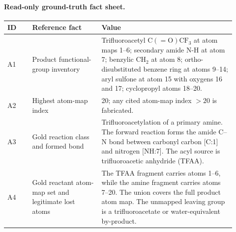 \begin{appendices}
\paragraph{Read-only ground-truth fact sheet.}
\begin{longtable}{P{0.10\linewidth}P{0.28\linewidth}P{0.54\linewidth}}
\toprule
\textbf{ID} & \textbf{Reference fact} & \textbf{Value} \\
\midrule
A1 & Product functional-group inventory & Trifluoroacetyl \(\mathrm{C(=O)CF_3}\) at atom maps 1--6; secondary amide N-H at atom 7; benzylic \(\mathrm{CH_2}\) at atom 8; ortho-disubstituted benzene ring at atoms 9--14; aryl sulfone at atom 15 with oxygens 16 and 17; cyclopropyl atoms 18--20. \\
A2 & Highest atom-map index & 20; any cited atom-map index \(>20\) is fabricated. \\
A3 & Gold reaction class and formed bond & Trifluoroacetylation of a primary amine. The forward reaction forms the amide C--N bond between carbonyl carbon [C:1] and nitrogen [NH:7]. The acyl source is trifluoroacetic anhydride (TFAA). \\
A4 & Gold reactant atom-map set and legitimate lost atoms & The TFAA fragment carries atoms 1--6, while the amine fragment carries atoms 7--20. The union covers the full product atom map. The unmapped leaving group is a trifluoroacetate or water-equivalent by-product. \\
\bottomrule
\end{longtable}


\end{appendices}
